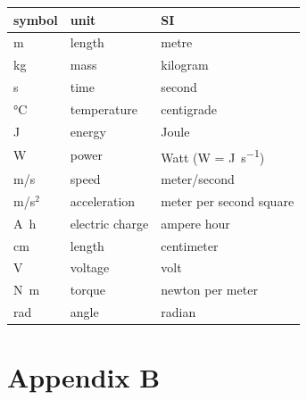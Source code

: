 \documentclass[12pt]{article}
\begin{document}
\renewcommand{\arraystretch}{1.2}
\noindent \begin{tabular}{l l l}
    \toprule
    \textbf{symbol}    & \textbf{unit}   & \textbf{SI}                       \\
    \midrule
    \si{\metre}        & length          & metre                             \\
    \si{\kilogram}     & mass            & kilogram                          \\
    \si{\second}       & time            & second                            \\
    \si{\celsius}      & temperature     & centigrade                        \\
    \si{\joule}        & energy          & Joule                             \\
    \si{\watt}         & power           & Watt (W = \si{\joule\per\second}) \\

    \si{m/s}           & speed           & meter/second                      \\
    m/s$^2$            & acceleration    & meter per second square           \\
    \si{\ampere\hour}  & electric charge & ampere hour                       \\
    cm                 & length          & centimeter                        \\
    \si{\volt}         & voltage         & volt                              \\
    \si{\newton\meter} & torque          & newton per meter                  \\
    \si{\radian}       & angle           & radian                            \\

    \bottomrule
\end{tabular}

\printnoidxglossary[type=\acronymtype,style=mystyle,title=Abbreviations and Acronyms]

\newpage
\section{Appendix B}
\end{document}
